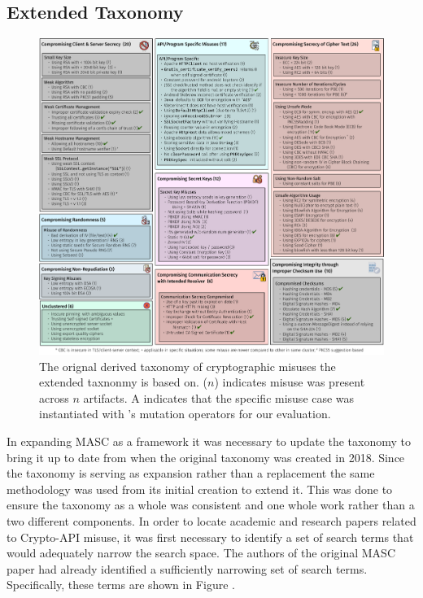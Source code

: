 \subsection{Extended Taxonomy}
\label{ch2:sec:taxonomy}

\begin{figure}[!ht]
	\centering
    \includegraphics[width=0.96\linewidth]{figures/taxonomy.pdf}
	\vspace{-1.em}
    \caption{\small The orignal derived taxonomy of cryptographic misuses the extended taxnonmy is based on. ($n$) indicates misuse was present across $n$ artifacts.  A \checkmark indicates that the specific misuse case was instantiated with \tool's mutation operators for our evaluation.}
    \label{fig:taxonomy}
	
\end{figure}

In expanding MASC as a framework it was necessary to update the taxonomy to bring it up to date from when the original taxonomy was created in 2018. Since the taxonomy is serving as expansion rather than a replacement the same methodology was used from its initial creation to extend it. This was done to ensure the taxonomy as a whole was consistent and one whole work rather than a two different components. In order to locate academic and research papers related to Crypto-API misuse, it was first necessary to identify a set of search terms that would adequately narrow the search space. The authors of the original MASC paper had already identified a sufficiently narrowing set of search terms.  Specifically, these terms are shown in Figure .

